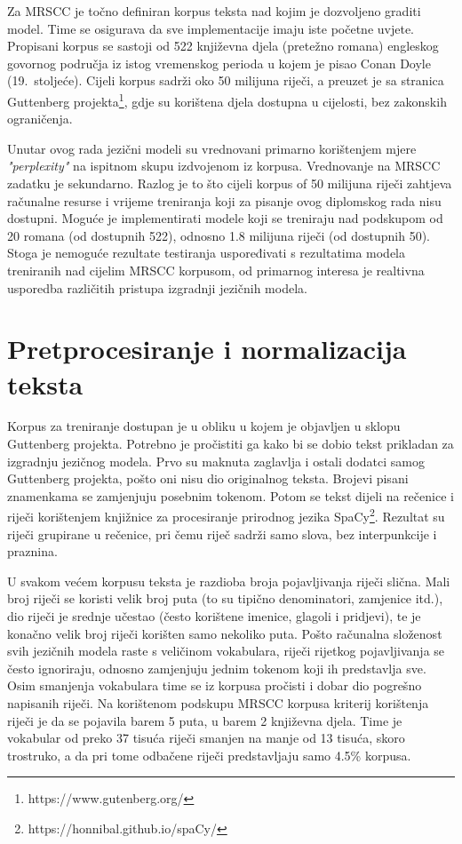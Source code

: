 \documentclass[times, utf8, diplomski, numeric]{fer}
\begin{document}
Za MRSCC je točno definiran korpus teksta nad kojim je dozvoljeno graditi model. Time se osigurava da sve implementacije imaju iste početne uvjete. Propisani korpus se sastoji od 522 književna djela (pretežno romana) engleskog govornog područja iz istog vremenskog perioda u kojem je pisao Conan Doyle (19.\ stoljeće). Cijeli korpus sadrži oko 50 milijuna riječi, a preuzet je sa stranica Guttenberg projekta\footnote{https://www.gutenberg.org/}, gdje su korištena djela dostupna u cijelosti, bez zakonskih ograničenja.

Unutar ovog rada jezični modeli su vrednovani primarno korištenjem mjere \textit{"perplexity"} na ispitnom skupu izdvojenom iz korpusa. Vrednovanje na MRSCC zadatku je sekundarno. Razlog je to što cijeli korpus of 50 milijuna riječi zahtjeva računalne resurse i vrijeme treniranja koji za pisanje ovog diplomskog rada nisu dostupni. Moguće je implementirati modele koji se treniraju nad podskupom od 20 romana (od dostupnih 522), odnosno 1.8 milijuna riječi (od dostupnih 50). Stoga je nemoguće rezultate testiranja uspoređivati s rezultatima modela treniranih nad cijelim MRSCC korpusom, od primarnog interesa je realtivna usporedba različitih pristupa izgradnji jezičnih modela.

\section{Pretprocesiranje i normalizacija teksta}

Korpus za treniranje dostupan je u obliku u kojem je objavljen u sklopu Guttenberg projekta. Potrebno je pročistiti ga kako bi se dobio tekst prikladan za izgradnju jezičnog modela. Prvo su maknuta zaglavlja i ostali dodatci samog Guttenberg projekta, pošto oni nisu dio originalnog teksta. Brojevi pisani znamenkama se zamjenjuju posebnim tokenom. Potom se tekst dijeli na rečenice i riječi korištenjem knjižnice za procesiranje prirodnog jezika SpaCy\footnote{https://honnibal.github.io/spaCy/}. Rezultat su riječi grupirane u rečenice, pri čemu riječ sadrži samo slova, bez interpunkcije i praznina.

U svakom većem korpusu teksta je razdioba broja pojavljivanja riječi slična. Mali broj riječi se koristi velik broj puta (to su tipično denominatori, zamjenice itd.), dio riječi je srednje učestao (često korištene imenice, glagoli i pridjevi), te je konačno velik broj riječi korišten samo nekoliko puta. Pošto računalna složenost svih jezičnih modela raste s veličinom vokabulara, riječi rijetkog pojavljivanja se često ignoriraju, odnosno zamjenjuju jednim tokenom koji ih predstavlja sve. Osim smanjenja vokabulara time se iz korpusa pročisti i dobar dio pogrešno napisanih riječi. Na korištenom podskupu MRSCC korpusa kriterij korištenja riječi je da se pojavila barem 5 puta, u barem 2 književna djela. Time je vokabular od preko 37 tisuća riječi smanjen na manje od 13 tisuća, skoro trostruko, a da pri tome odbačene riječi predstavljaju samo 4.5\% korpusa.
\end{document}
